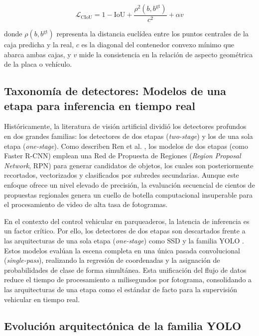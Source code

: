 \begin{equation}
    \mathcal{L}_{\text{CIoU}}
    =
    1 - \text{IoU} + \frac{\rho^2(b, b^{\text{gt}})}{c^2} + \alpha v
\end{equation}

donde $\rho(b, b^{\text{gt}})$ representa la distancia euclídea entre los puntos
centrales de la caja predicha y la real, $c$ es la diagonal del contenedor
convexo mínimo que abarca ambas cajas, y $v$ mide la consistencia en la relación
de aspecto geométrica de la placa o vehículo.

\subsection{Taxonomía de detectores: Modelos de una etapa para inferencia en tiempo real}

Históricamente, la literatura de visión artificial dividió los detectores
profundos en dos grandes familias: los detectores de dos etapas
(\textit{two-stage}) y los de una sola etapa (\textit{one-stage}). Como
describen Ren et al. \cite{ren2015faster}, los modelos de dos etapas (como
Faster R-CNN) emplean una Red de Propuesta de Regiones (\textit{Region Proposal
Network}, RPN) para generar candidatos de objetos, los cuales son posteriormente
recortados, vectorizados y clasificados por subredes secundarias. Aunque este
enfoque ofrece un nivel elevado de precisión, la evaluación secuencial de
cientos de propuestas regionales genera un cuello de botella computacional
insuperable para el procesamiento de video de alta tasa de fotogramas.

En el contexto del control vehicular en parqueaderos, la latencia de inferencia
es un factor crítico. Por ello, los detectores de dos etapas son descartados
frente a las arquitecturas de una sola etapa (\textit{one-stage}) como SSD
\cite{liu2016ssd} y la familia YOLO \cite{redmon2016yolo, wang2024yolov1to10}.
Estos modelos evalúan la escena completa en una única pasada convolucional
(\textit{single-pass}), realizando la regresión de coordenadas y la asignación
de probabilidades de clase de forma simultánea. Esta unificación del flujo de
datos reduce el tiempo de procesamiento a milisegundos por fotograma,
consolidando a las arquitecturas de una etapa como el estándar de facto para la
supervisión vehicular en tiempo real.

\subsection{Evolución arquitectónica de la familia YOLO}

